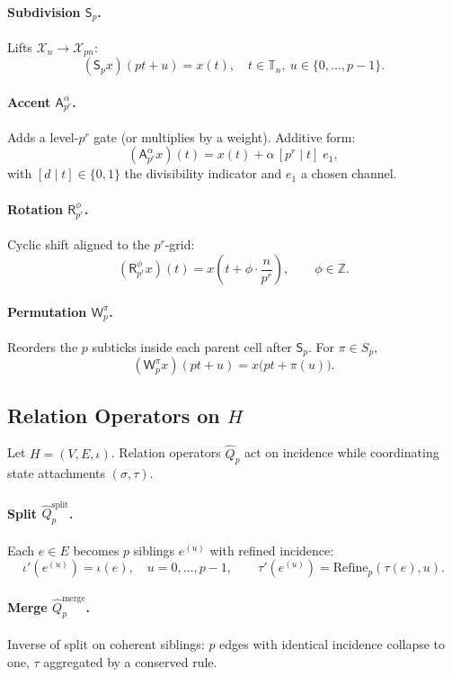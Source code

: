 \documentclass[12pt]{article}
\numberwithin{equation}{section}
\theoremstyle{plain}
\theoremstyle{definition}
\theoremstyle{remark}
\begin{document}
\paragraph{Subdivision \(\mathsf{S}_p\).}
Lifts \(\mathcal{X}_n\to \mathcal{X}_{pn}\):
\[
(\mathsf{S}_p x)(pt+u)=x(t),\quad t\in\mathbb{T}_n,\ u\in\{0,\dots,p-1\}.
\]

\paragraph{Accent \(\mathsf{A}_{p^r}^{\alpha}\).}
Adds a level-\(p^r\) gate (or multiplies by a weight). Additive form:
\[
(\mathsf{A}_{p^r}^{\alpha}x)(t)=x(t)+\alpha\,[p^r\mid t]\;e_1,
\]
with \([d\mid t]\in\{0,1\}\) the divisibility indicator and \(e_1\) a chosen channel.

\paragraph{Rotation \(\mathsf{R}_{p^r}^{\phi}\).}
Cyclic shift aligned to the \(p^r\)-grid:
\[
(\mathsf{R}_{p^r}^{\phi}x)(t)=x\!\left(t+\phi\cdot\frac{n}{p^r}\right),\qquad \phi\in\mathbb{Z}.
\]

\paragraph{Permutation \(\mathsf{W}_p^{\pi}\).}
Reorders the \(p\) subticks inside each parent cell after \(\mathsf{S}_p\). For \(\pi\in S_p\),
\[
(\mathsf{W}_p^{\pi}x)(pt+u)=x\big(pt+\pi(u)\big).
\]

\subsection*{Relation Operators on \(H\)}
Let \(H=(V,E,\iota)\). Relation operators \(\hat{Q}_p\) act on incidence while coordinating state attachments \((\sigma,\tau)\).

\paragraph{Split \(\hat{Q}_p^{\mathrm{split}}\).}
Each \(e\in E\) becomes \(p\) siblings \(e^{(u)}\) with refined incidence:
\[
\iota'(e^{(u)})=\iota(e),\quad u=0,\dots,p-1,\qquad \tau'(e^{(u)})=\mathrm{Refine}_p(\tau(e),u).
\]

\paragraph{Merge \(\hat{Q}_p^{\mathrm{merge}}\).}
Inverse of split on coherent siblings: \(p\) edges with identical incidence collapse to one, \(\tau\) aggregated by a conserved rule.
\end{document}
